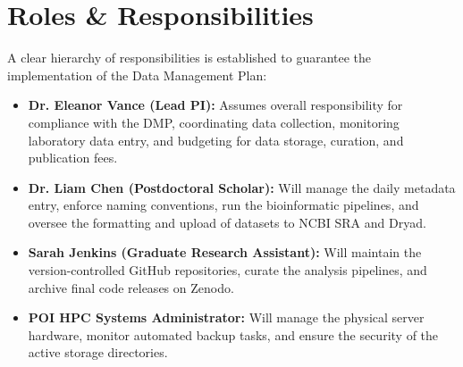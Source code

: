 \section{Roles \& Responsibilities}
A clear hierarchy of responsibilities is established to guarantee the implementation of the Data Management Plan:
\begin{itemize}
    \item \textbf{Dr. Eleanor Vance (Lead PI):} Assumes overall responsibility for compliance with the DMP, coordinating data collection, monitoring laboratory data entry, and budgeting for data storage, curation, and publication fees.
    \item \textbf{Dr. Liam Chen (Postdoctoral Scholar):} Will manage the daily metadata entry, enforce naming conventions, run the bioinformatic pipelines, and oversee the formatting and upload of datasets to NCBI SRA and Dryad.
    \item \textbf{Sarah Jenkins (Graduate Research Assistant):} Will maintain the version-controlled GitHub repositories, curate the analysis pipelines, and archive final code releases on Zenodo.
    \item \textbf{POI HPC Systems Administrator:} Will manage the physical server hardware, monitor automated backup tasks, and ensure the security of the active storage directories.
\end{itemize}
